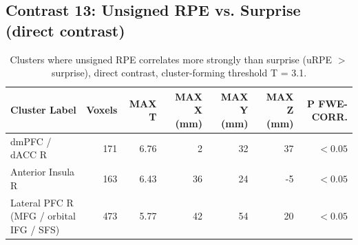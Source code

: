 \subsection{\rev Contrast 13: Unsigned RPE vs. Surprise (direct contrast)}


\begin{table}[htbp]
    \centering
    \rev%
    \begin{threeparttable}
    \caption{Clusters where unsigned RPE correlates more strongly than surprise
    (uRPE $>$ surprise), direct contrast, cluster-forming threshold T = 3.1.}
    \label{tab:con13_pos}%
    \begin{tabularx}{\textwidth}{l *{6}{R}}
        \toprule
        \textbf{Cluster Label} & \textbf{Voxels} & \textbf{MAX T} & \textbf{MAX X (mm)} & \textbf{MAX Y (mm}) & \textbf{MAX Z (mm)} & \textbf{P FWE-CORR.} \\
        \midrule
        dmPFC / dACC R & 171 & 6.76 & 2 & 32 & 37 & $<0.05$ \\
        Anterior Insula R & 163 & 6.43 & 36 & 24 & -5 & $<0.05$ \\
        Lateral PFC R (MFG / orbital IFG / SFS) & 473 & 5.77 & 42 & 54 & 20 & $<0.05$ \\
        \bottomrule
    \end{tabularx}
    \end{threeparttable}
\end{table}%


